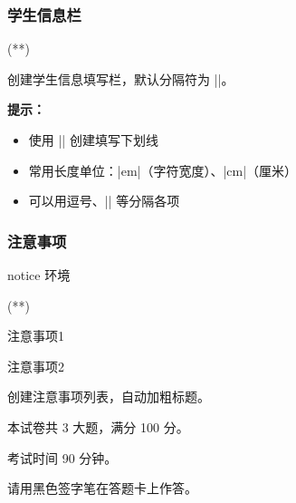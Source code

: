 \subsubsection{学生信息栏}

\begin{function}{\information}
  \begin{ccnusyntax}
    \information(**)
  \end{ccnusyntax}

  创建学生信息填写栏，默认分隔符为 |\quad|。
\end{function}

\begin{latexcode}
\end{latexcode}

\textbf{提示：}
\begin{itemize}
  \item 使用 |\underline{\hspace{长度}}| 创建填写下划线
  \item 常用长度单位：|em|（字符宽度）、|cm|（厘米）
  \item 可以用逗号、|\quad| 等分隔各项
\end{itemize}

\subsubsection{注意事项}

\begin{function}{notice 环境}
  \begin{ccnusyntax}
    \begin{notice}(**)
      \item 注意事项1
      \item 注意事项2
    \end{notice}
  \end{ccnusyntax}

  创建注意事项列表，自动加粗标题。
\end{function}

\begin{latexcode}
  \begin{notice}
    \item 本试卷共 3 大题，满分 100 分。
    \item 考试时间 90 分钟。
    \item 请用黑色签字笔在答题卡上作答。
  \end{notice}
\end{latexcode}

